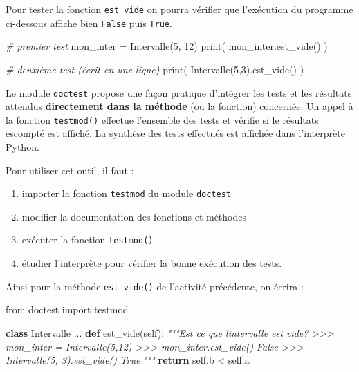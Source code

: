 \documentclass[a4paper,17pt]{extarticle}
\providecommand{\tightlist}{%
      \setlength{\itemsep}{0pt}\setlength{\parskip}{0pt}}
\newenvironment{Shaded}{}{}
\newcommand{\KeywordTok}[1]{\textcolor[rgb]{0.00,0.44,0.13}{\textbf{{#1}}}}
\newcommand{\DecValTok}[1]{\textcolor[rgb]{0.25,0.63,0.44}{{#1}}}
\newcommand{\CommentTok}[1]{\textcolor[rgb]{0.38,0.63,0.69}{\textit{{#1}}}}
\newcommand{\NormalTok}[1]{{#1}}
\newcommand{\ImportTok}[1]{{#1}}
\newcommand{\VariableTok}[1]{\textcolor[rgb]{0.10,0.09,0.49}{{#1}}}
\newcommand{\ControlFlowTok}[1]{\textcolor[rgb]{0.00,0.44,0.13}{\textbf{{#1}}}}
\newcommand{\OperatorTok}[1]{\textcolor[rgb]{0.40,0.40,0.40}{{#1}}}
\newcommand{\BuiltInTok}[1]{{#1}}
\begin{document}
\begin{reponse}
Pour tester la fonction \texttt{est\_vide} on pourra vérifier que
l'exécution du programme ci-dessous affiche bien \texttt{False} puis
\texttt{True}.

\begin{Shaded}
\begin{Highlighting}[]
\CommentTok{\# premier test}
\NormalTok{mon\_inter }\OperatorTok{=}\NormalTok{ Intervalle(}\DecValTok{5}\NormalTok{, }\DecValTok{12}\NormalTok{)}
\BuiltInTok{print}\NormalTok{( mon\_inter.est\_vide() )}

\CommentTok{\# deuxième test (écrit en une ligne)}
\BuiltInTok{print}\NormalTok{( Intervalle(}\DecValTok{5}\NormalTok{,}\DecValTok{3}\NormalTok{).est\_vide() )}
\end{Highlighting}
\end{Shaded}

        \end{reponse}\begin{retenir}
    Le module \texttt{doctest} propose une façon pratique d'intégrer les
tests et les résultats attendus \textbf{directement dans la méthode} (ou
la fonction) concernée. Un appel à la fonction \texttt{testmod()}
effectue l'ensemble des tests et vérifie si le résultats escompté est
affiché. La synthèse des tests effectués est affichée dans l'interprète
Python.

Pour utiliser cet outil, il faut :

\begin{enumerate}
\def\labelenumi{\arabic{enumi}.}
\tightlist
\item
  importer la fonction \texttt{testmod} du module \texttt{doctest}
\item
  modifier la documentation des fonctions et méthodes
\item
  exécuter la fonction \texttt{testmod()}
\item
  étudier l'interprète pour vérifier la bonne exécution des tests.
\end{enumerate}

        \end{retenir}\begin{exemple}
    Ainsi pour la méthode \texttt{est\_vide()} de l'activité précédente, on
écrira :

\begin{Shaded}
\begin{Highlighting}[]
\ImportTok{from}\NormalTok{ doctest }\ImportTok{import}\NormalTok{ testmod}

\KeywordTok{class}\NormalTok{ Intervalle}
\NormalTok{    ...}
    \KeywordTok{def}\NormalTok{ est\_vide(}\VariableTok{self}\NormalTok{):}
        \CommentTok{"""Est ce que l\textquotesingle{}intervalle est vide?}
\CommentTok{        \textgreater{}\textgreater{}\textgreater{} mon\_inter = Intervalle(5,12)}
\CommentTok{        \textgreater{}\textgreater{}\textgreater{} mon\_inter.est\_vide()}
\CommentTok{        False}
\CommentTok{        \textgreater{}\textgreater{}\textgreater{} Intervalle(5, 3).est\_vide()}
\CommentTok{        True}
\CommentTok{        """}
        \ControlFlowTok{return} \VariableTok{self}\NormalTok{.b }\OperatorTok{\textless{}} \VariableTok{self}\NormalTok{.a}


\end{Highlighting}
\end{Shaded}
\end{exemple}
\end{document}
